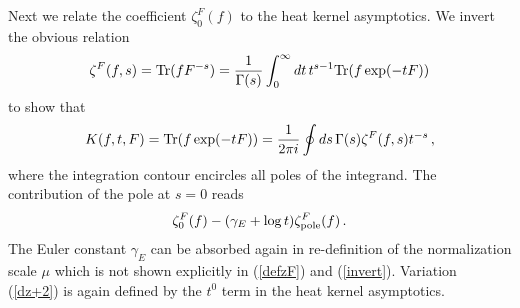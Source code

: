 \documentclass[a4paper,12pt]{article}
\begin{document}
Next we relate the coefficient $\zeta^F_0 (f)$ to the heat
kernel asymptotics. We invert the obvious relation
\begin{equation}
\zeta^F (f,s)= {\rm Tr}(fF^{-s})=
\frac 1{\Gamma (s)} \int_0^\infty dt\, t^{s-1}
{\rm Tr} (f\exp (-tF))  \label{defzF}
\end{equation}
to show that
\begin{equation}
K(f,t,F)={\rm Tr} (f\exp (-tF))
=\frac 1{2\pi i} \oint ds\, \Gamma (s)\zeta^F (f,s) t^{-s}\,,
\label{invert}
\end{equation}
where the integration contour encircles all poles of the integrand.
The contribution of the pole at $s=0$ reads
\begin{equation}
\zeta^F_0(f) -(\gamma_E +\log t )\zeta^F_{\mbox{\scriptsize pole}}(f)
\,. \label{polecont}
\end{equation}
The Euler constant $\gamma_E$ can be absorbed again
in re-definition of the normalization scale $\mu$ which
is not shown explicitly in (\ref{defzF}) and (\ref{invert}).
Variation (\ref{dz+2}) is again defined by the $t^0$
term in the heat kernel asymptotics.
\end{document}
